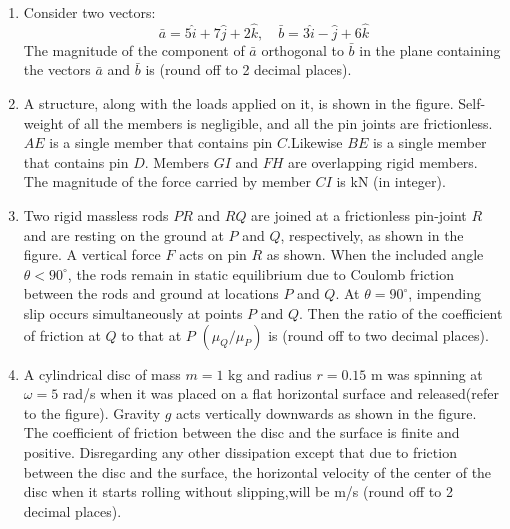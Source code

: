 \documentclass[journal,12pt,onecolumn]{IEEEtran}
\theoremstyle{remark}
\begin{document}
\begin{enumerate}
    \item Consider two vectors:
\[
    \bar{a} = 5\hat{i} + 7\hat{j} + 2\hat{k}, \quad \bar{b} = 3\hat{i} - \hat{j} + 6\hat{k}
\]
    The magnitude of the component of $\bar{a}$ orthogonal to $\bar{b}$ in the plane containing the vectors $\bar{a}$ and $\bar{b}$ is {\underline{\hspace{2cm}}}(round off to 2 decimal places).

    \item A structure, along with the loads applied on it, is shown in the figure. Self-weight of all the members is negligible, and all the pin joints are frictionless. $AE$ is a single member that contains pin $C$.Likewise $BE$ is a single member that contains pin $D$. Members $GI$ and $FH$ are overlapping rigid members. The magnitude of the force carried by member $CI$ is {\underline{\hspace{2cm}}} kN (in integer).
     \begin{figure}[H]
        \centering
    \end{figure}
       
   

    \item Two rigid massless rods $PR$ and $RQ$ are joined at a frictionless pin-joint $R$ and are resting on the ground at $P$ and $Q$, respectively, as shown in the figure. A vertical force $F$ acts on pin $R$ as shown. When the included angle $\theta < 90^\circ$, the rods remain in static equilibrium due to Coulomb friction between the rods and ground at locations $P$ and $Q$. At $\theta = 90^\circ$, impending slip occurs simultaneously at points $P$ and $Q$. Then the ratio of the coefficient of friction at $Q$ to that at $P$ $(\mu_Q / \mu_P)$ is {\underline{\hspace{2cm}}} (round off to two decimal places).
     \begin{figure}[H]
        \centering
    \end{figure}
       
   

    \item A cylindrical disc of mass $m = 1$ kg and radius $r = 0.15$ m was spinning at $\omega = 5$ rad/s when it was placed on a flat horizontal surface and released(refer to the figure). Gravity $g$ acts vertically downwards as shown in the figure. The coefficient of friction between the disc and the surface is finite and positive. Disregarding any other dissipation except that due to friction between the disc and the surface, the horizontal velocity of the center of the disc when it starts rolling without slipping,will be{\underline{\hspace{2cm}}} m/s (round off to 2 decimal places).
     \begin{figure}[H]
        \centering
    \end{figure}
       

\end{enumerate}
\end{document}
